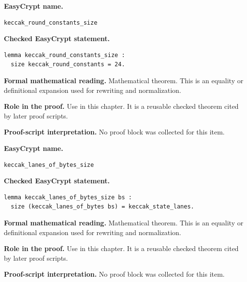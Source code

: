 \begin{formaltheorem}
\noindent\textbf{EasyCrypt name.}
\begin{lstlisting}[language=EasyCrypt,basicstyle=\ttfamily\scriptsize]
keccak_round_constants_size
\end{lstlisting}
\noindent\textbf{Checked EasyCrypt statement.}
\begin{lstlisting}[language=EasyCrypt,basicstyle=\ttfamily\scriptsize]
lemma keccak_round_constants_size :
  size keccak_round_constants = 24.
\end{lstlisting}
\noindent\textbf{Formal mathematical reading.}
Mathematical theorem. This is an equality or definitional expansion used for rewriting and normalization.

\noindent\textbf{Role in the proof.}
Use in this chapter. It is a reusable checked theorem cited by later proof scripts.

\noindent\textbf{Proof-script interpretation.}
No proof block was collected for this item.

\end{formaltheorem}

\begin{formaltheorem}
\noindent\textbf{EasyCrypt name.}
\begin{lstlisting}[language=EasyCrypt,basicstyle=\ttfamily\scriptsize]
keccak_lanes_of_bytes_size
\end{lstlisting}
\noindent\textbf{Checked EasyCrypt statement.}
\begin{lstlisting}[language=EasyCrypt,basicstyle=\ttfamily\scriptsize]
lemma keccak_lanes_of_bytes_size bs :
  size (keccak_lanes_of_bytes bs) = keccak_state_lanes.
\end{lstlisting}
\noindent\textbf{Formal mathematical reading.}
Mathematical theorem. This is an equality or definitional expansion used for rewriting and normalization.

\noindent\textbf{Role in the proof.}
Use in this chapter. It is a reusable checked theorem cited by later proof scripts.

\noindent\textbf{Proof-script interpretation.}
No proof block was collected for this item.

\end{formaltheorem}

